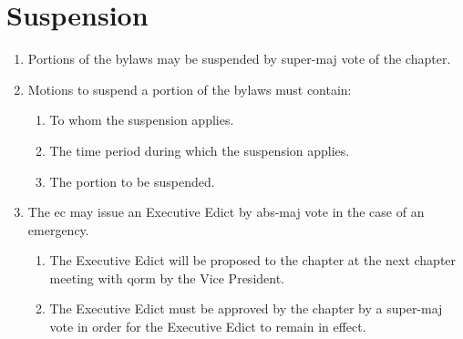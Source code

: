 \section{Suspension}
\label{suspend-bylaws}
	\begin{enumerate}
		\item Portions of the bylaws may be suspended by \gls{super-maj} vote of the chapter.
		\item Motions to suspend a portion of the bylaws must contain:
			\begin{enumerate}
				\item To whom the suspension applies.
				\item The time period during which the suspension applies.
				\item The portion to be suspended.
			\end{enumerate}
		\item The \gls{ec} may issue an Executive Edict by \gls{abs-maj} vote in the case of an emergency.
			\begin{enumerate}
				\item The Executive Edict will be proposed to the chapter at the next chapter meeting with \gls{qorm} by the Vice President.
				\item The Executive Edict must be approved by the chapter by a \gls{super-maj} vote in order for the Executive Edict to remain in effect.
			\end{enumerate}
	\end{enumerate}

